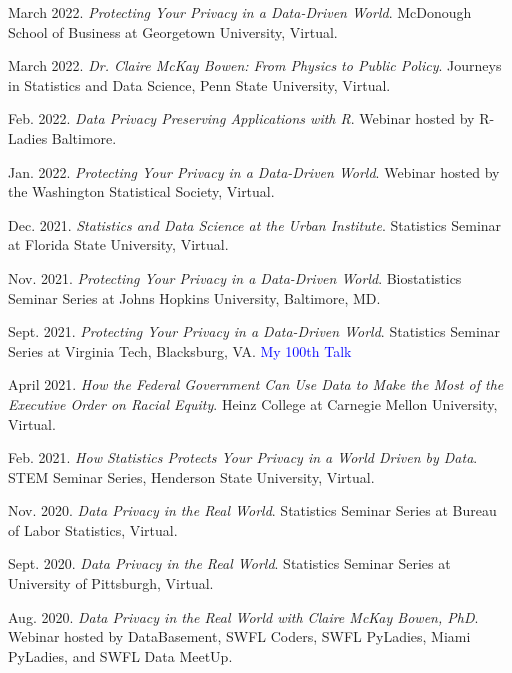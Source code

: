 \begin{etaremune}[topsep=0pt, itemsep=4pt, partopsep=0pt, parsep=0pt]
    \item March 2022. \textit{Protecting Your Privacy in a Data-Driven World}. McDonough School of Business at Georgetown University, Virtual.
    
    \item March 2022. \textit{Dr. Claire McKay Bowen: From Physics to Public Policy}. Journeys in Statistics and Data Science, Penn State University, Virtual.
        
    \item Feb. 2022. \textit{Data Privacy Preserving Applications with R}. Webinar hosted by R-Ladies Baltimore.

    \item Jan. 2022. \textit{Protecting Your Privacy in a Data-Driven World}. Webinar hosted by the Washington Statistical Society, Virtual.
    
    \item Dec. 2021. \textit{Statistics and Data Science at the Urban Institute}. Statistics Seminar at Florida State University, Virtual.
    
    \item Nov. 2021. \textit{Protecting Your Privacy in a Data-Driven World}. Biostatistics Seminar Series at Johns Hopkins University, Baltimore, MD.
    
    \item Sept. 2021. \textit{Protecting Your Privacy in a Data-Driven World}. Statistics Seminar Series at Virginia Tech, Blacksburg, VA. \textcolor{blue}{My 100th Talk}
    
    \item April 2021. \textit{How the Federal Government Can Use Data to Make the Most of the Executive Order on Racial Equity}. Heinz College at Carnegie Mellon University, Virtual.

    \item Feb. 2021. \textit{How Statistics Protects Your Privacy in a World Driven by Data}. STEM Seminar Series, Henderson State University, Virtual.

    \item Nov. 2020. \textit{Data Privacy in the Real World}. Statistics Seminar Series at Bureau of Labor Statistics, Virtual.

    \item Sept. 2020. \textit{Data Privacy in the Real World}. Statistics Seminar Series at University of Pittsburgh, Virtual.
        
    \item Aug. 2020. \textit{Data Privacy in the Real World with Claire McKay Bowen, PhD}. Webinar hosted by DataBasement, SWFL Coders, SWFL PyLadies, Miami PyLadies, and SWFL Data MeetUp.
    

\end{etaremune}
